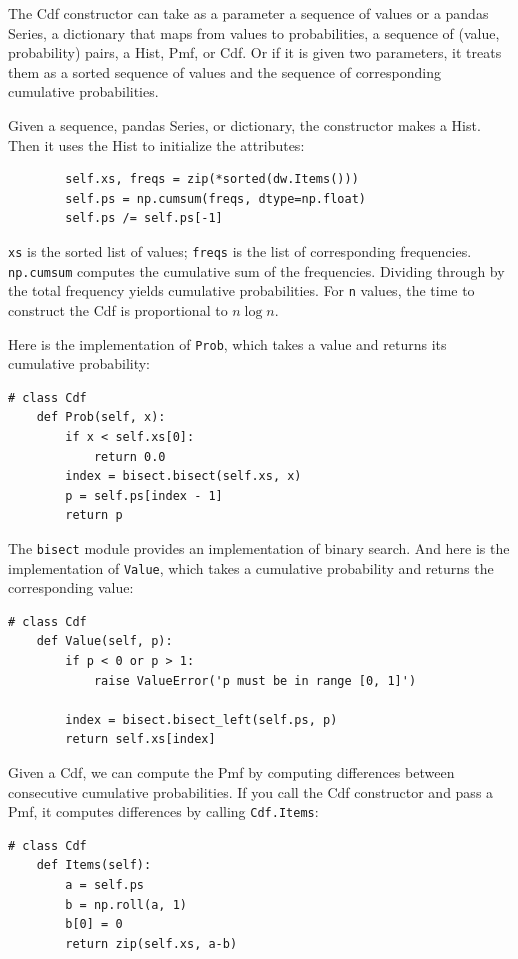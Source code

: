 \documentclass[12pt]{book}
\begin{document}
The Cdf constructor can take as a parameter a sequence of values
or a pandas Series, a dictionary that maps from values to
probabilities, a sequence of (value, probability) pairs, a Hist, Pmf,
or Cdf.  Or if it is given two parameters, it treats them as a sorted
sequence of values and the sequence of corresponding cumulative
probabilities.

Given a sequence, pandas Series, or dictionary, the constructor makes
a Hist.  Then it uses the Hist to initialize the attributes:

\begin{verbatim}
        self.xs, freqs = zip(*sorted(dw.Items()))
        self.ps = np.cumsum(freqs, dtype=np.float)
        self.ps /= self.ps[-1]
\end{verbatim}

{\tt xs} is the sorted list of values; {\tt freqs} is the list
of corresponding frequencies.  {\tt np.cumsum} computes
the cumulative sum of the frequencies.  Dividing through by the
total frequency yields cumulative probabilities.
For {\tt n} values, the time to construct the
Cdf is proportional to $n \log n$.

Here is the implementation of {\tt Prob}, which takes a value
and returns its cumulative probability: 

\begin{verbatim}
# class Cdf
    def Prob(self, x):
        if x < self.xs[0]:
            return 0.0
        index = bisect.bisect(self.xs, x)
        p = self.ps[index - 1]
        return p
\end{verbatim}

The {\tt bisect} module provides an implementation of binary search.
And here is the implementation of {\tt Value}, which takes a
cumulative probability and returns the corresponding value:

\begin{verbatim}
# class Cdf
    def Value(self, p):
        if p < 0 or p > 1:
            raise ValueError('p must be in range [0, 1]')

        index = bisect.bisect_left(self.ps, p)
        return self.xs[index]
\end{verbatim}

Given a Cdf, we can compute the Pmf by computing differences between
consecutive cumulative probabilities.  If you call the Cdf constructor
and pass a Pmf, it computes differences by calling {\tt Cdf.Items}:

\begin{verbatim}
# class Cdf
    def Items(self):
        a = self.ps
        b = np.roll(a, 1)
        b[0] = 0
        return zip(self.xs, a-b)
\end{verbatim}
\end{document}
